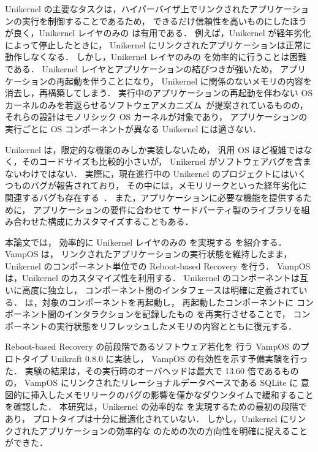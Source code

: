 Unikernel の主要なタスクは，ハイパーバイザ上でリンクされたアプリケーションの実行を制御することであるため，
できるだけ信頼性を高いものにしたほうが良く，Unikernel レイヤのみの \rr は有用である．
例えば，Unikernel が経年劣化によって停止したときに，
Unikernel にリンクされたアプリケーションは正常に動作しなくなる．
しかし，Unikernel レイヤのみの \rr を効率的に行うことは困難である．
Unikernel レイヤとアプリケーションの結びつきが強いため，
アプリケーションの再起動を伴うことになり，
Unikernel に関係のないメモリの内容を消去し，再構築してしまう．
実行中のアプリケーションの再起動を伴わない OS カーネルのみを若返らせるソフトウェアメカニズム~\cite{DepoutovitchEtAl-otherworld,TeradaEtAl-Dwarf}が提案されているものの，
それらの設計はモノリシック OS カーネルが対象であり，
アプリケーションの実行ごとに OS コンポーネントが異なる Unikernel には適さない．

Unikernel は，限定的な機能のみしか実装しないため，
汎用 OS ほど複雑ではなく，そのコードサイズも比較的小さいが，
Unikernel がソフトウェアバグを含まないわけではない．
実際に，現在進行中の Unikernel のプロジェクトにはいくつものバグが報告されており，
その中には，メモリリークといった経年劣化に関連するバグも存在する~\cite{Memleak-Unikraft,Memeleak-Mirage}．
また，アプリケーションに必要な機能を提供するために，
アプリケーションの要件に合わせて
サードパーティ製のライブラリを組み合わせた構成にカスタマイズすることもある．


本論文では，
効率的に Unikernel レイヤのみの \rr を実現する \emph{\sysname} を紹介する．
VampOS は，
リンクされたアプリケーションの実行状態を維持したまま，
Unikernel のコンポーネント単位での Reboot-based Recovery を行う．
VampOS は，Unikernel のカスタマイズ性を利用する．
Unikernel のコンポーネントは互いに高度に独立し，
コンポーネント間のインタフェースは明確に定義されている．
\sysname は，対象のコンポーネントを再起動し，
再起動したコンポーネントに
コンポーネント間のインタラクションを記録したもの
を再実行させることで，
コンポーネントの実行状態をリフレッシュしたメモリの内容とともに復元する．

Reboot-based Recovery の前段階であるソフトウェア若化を
行う VampOS のプロトタイプ Unikraft 0.8.0 に実装し，
VampOS の有効性を示す予備実験を行った．
実験の結果は，その実行時のオーバヘッドは最大で 13.60 倍であるものの，
VampOS にリンクされたリレーショナルデータベースである SQLite に
意図的に挿入したメモリリークのバグの影響を僅かなダウンタイムで緩和することを確認した．
本研究は，Unikernel の効率的な \rr を実現するための最初の段階であり，
プロトタイプは十分に最適化されていない．
しかし，Unikernel にリンクされたアプリケーションの効率的な \rr のための次の方向性を明確に捉えることができた．

